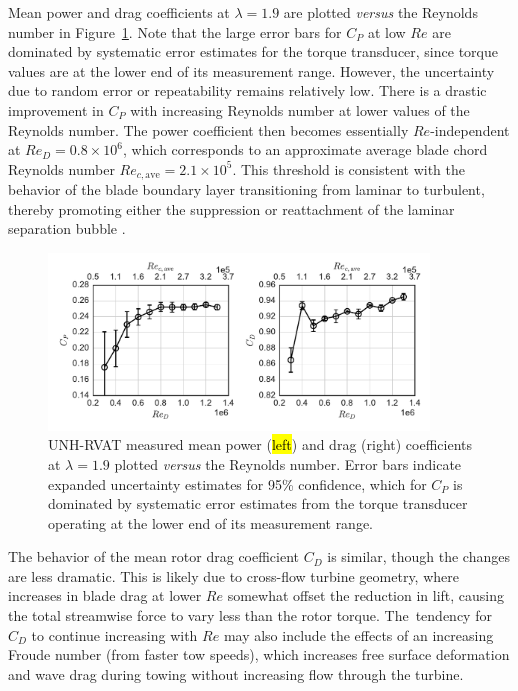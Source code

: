 \documentclass[energies,article,accept,moreauthors,pdftex,10pt,a4paper]{mdpi}
\theoremstyle{mdpi}
\newcounter{ex}
\newcounter{re}
\begin{document}
Mean power and drag coefficients at $\lambda=1.9$ are plotted \textit{versus} the Reynolds
number in Figure~\ref{fig:perf-Re-dep}. Note that the large error bars for $C_P$
at low $Re$ are dominated by systematic error estimates for the torque
transducer, since torque values are at the lower end of its measurement range.
However, the uncertainty due to random error or repeatability remains relatively
low. There is a drastic improvement in $C_P$ with increasing Reynolds number at
lower values of the Reynolds number. The power coefficient then becomes essentially
$Re$-independent at $Re_D = 0.8 \times 10^6$, which corresponds to an
approximate average blade chord Reynolds number $Re_{c, \mathrm{ave}} = 2.1
\times 10^5$. This threshold is consistent with the behavior of the blade
boundary layer transitioning from laminar to turbulent, thereby promoting either
the suppression or reattachment of the laminar separation bubble
\cite{Lissaman1983}.



\begin{figure}[H]
\centering

\includegraphics[width=0.9\textwidth]{figures/perf_re_dep}

\caption{UNH-RVAT measured mean power (\hl {left}) and drag (right) coefficients at
 $\lambda=1.9$ plotted \textit{versus} the Reynolds number. Error bars indicate expanded
 uncertainty estimates for 95\% confidence, which for $C_P$ is dominated by
 systematic error estimates from the torque transducer operating at the lower end
 of its measurement range.}
 

\label{fig:perf-Re-dep}
\end{figure}

The behavior of the mean rotor drag coefficient $C_D$ is similar, though the
changes are less dramatic. This is likely due to cross-flow turbine geometry,
where increases in blade drag at lower $Re$ somewhat offset the reduction in
lift, causing the total streamwise force to vary less than the rotor torque. The~tendency for $C_D$ to continue increasing with $Re$ may also include the effects
of an increasing Froude number (from faster tow speeds), which increases free
surface deformation and wave drag during towing without increasing flow through
the turbine.
\end{document}
